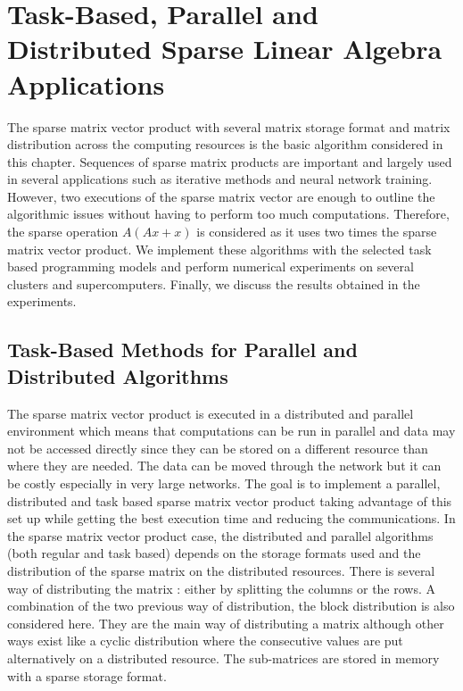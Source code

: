 %
\newcommand{\Array}{\KwSty{Array}}
\newcommand{\Integer}{\KwSty{Integer}}

\chapter{Task-Based, Parallel and Distributed Sparse Linear Algebra Applications \label{chap:exp_sparse}}
\graphicspath{{chapters/exp_sparse/}}

The sparse matrix vector product with several matrix storage format and matrix distribution across the computing resources is the basic algorithm considered in this chapter.
Sequences of sparse matrix products are important and largely used in several applications such as iterative methods and neural network training.
However, two executions of the sparse matrix vector are enough to outline the algorithmic issues without having to perform too much computations.
Therefore, the sparse operation $A(Ax+x)$ is considered as it uses two times the sparse matrix vector product.
We implement these algorithms with the selected task based programming models and perform numerical experiments on several clusters and supercomputers.
Finally, we discuss the results obtained in the experiments.


\section{Task-Based Methods for Parallel and Distributed Algorithms}
The sparse matrix vector product is executed in a distributed and parallel environment which means that computations can be run in parallel and data may not be accessed directly since they can be stored on a different resource than where they are needed.
The data can be moved through the network but it can be costly especially in very large networks.
The goal is to implement a parallel, distributed and task based sparse matrix vector product taking advantage of this set up while getting the best execution time and reducing the communications.
In the sparse matrix vector product case, the distributed and parallel algorithms (both regular and task based) depends on the storage formats used and the distribution of the sparse matrix on the distributed resources.
There is several way of distributing the matrix : either by splitting the columns or the rows.
A combination of the two previous way of distribution, the block distribution is also considered here.
They are the main way of distributing a matrix although other ways exist like a cyclic distribution where the consecutive values are put alternatively on a distributed resource.
The sub-matrices are stored in memory with a sparse storage format.


